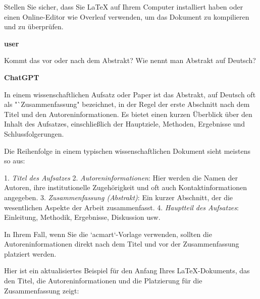 Stellen Sie sicher, dass Sie \LaTeX{} auf Ihrem Computer installiert haben oder einen Online-Editor wie Overleaf verwenden, um das Dokument zu kompilieren und zu überprüfen.

\textbf{user}

Kommt das vor oder nach dem Abstrakt? Wie nennt man Abstrakt auf Deutsch?

\textbf{ChatGPT}

In einem wissenschaftlichen Aufsatz oder Paper ist das Abstrakt, auf Deutsch oft als "`Zusammenfassung" bezeichnet, in der Regel der erste Abschnitt nach dem Titel und den Autoreninformationen. Es bietet einen kurzen Überblick über den Inhalt des Aufsatzes, einschließlich der Hauptziele, Methoden, Ergebnisse und Schlussfolgerungen.

Die Reihenfolge in einem typischen wissenschaftlichen Dokument sieht meistens so aus:

1. \textit{Titel des Aufsatzes}
2. \textit{Autoreninformationen}: Hier werden die Namen der Autoren, ihre institutionelle Zugehörigkeit und oft auch Kontaktinformationen angegeben.
3. \textit{Zusammenfassung (Abstrakt)}: Ein kurzer Abschnitt, der die wesentlichen Aspekte der Arbeit zusammenfasst.
4. \textit{Hauptteil des Aufsatzes}: Einleitung, Methodik, Ergebnisse, Diskussion usw.

In Ihrem Fall, wenn Sie die `acmart`-Vorlage verwenden, sollten die Autoreninformationen direkt nach dem Titel und vor der Zusammenfassung platziert werden. 

Hier ist ein aktualisiertes Beispiel für den Anfang Ihres \LaTeX{}-Dokuments, das den Titel, die Autoreninformationen und die Platzierung für die Zusammenfassung zeigt:

